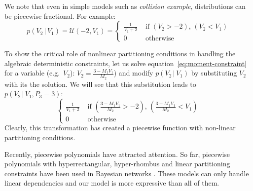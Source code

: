 \documentclass{article}
\newcommand{\case}[2]{#2 &\text{ if } #1}%
\newcommand{\otherwise}[1]{#1 &\text{ otherwise}}
\newcommand{\pr}{p}
\begin{document}
{{%
We note that even in simple models such as \emph{collision example}, distributions can be piecewise fractional. For example:  
\[
\pr(V_2 \,|\, V_1) = \mathcal{U}(-2, V_1)
=
\begin{cases}
  \case{\scriptstyle (V_2 > -2), \, (V_2 < V_1)}{\frac{1}{V_1 + 2}}\\
 \otherwise{0}
 \end{cases}
\]

To show the critical role of nonlinear partitioning conditions in handling the algebraic deterministic constraints, 
let us solve equation~\ref{eq:moment-constraint} for a variable (e.g.\ $V_2$):
$V_2 = \frac{3 - M_1 V_1}{M_2}$) and modify $\pr(V_2 \,|\, V_1)$ by substituting $V_2$ with its the solution.
We will see that this substitution leads to $\pr(V_2 \,|\, V_1, P_3 = 3)$:
\begin{equation}
\label{e:fractional-constraint}
\begin{cases}
  \case{(\frac{3 - M_1 V_1}{M_2} > -2) , \, (\frac{3 - M_1 V_1}{M_2} < V_1)}{\frac{1}{V_1 +2}}\\
  \otherwise{0}
  \end{cases}
\end{equation}
Clearly, this transformation has created a piecewise function with non-linear partitioning conditions.

Recently, piecewise polynomials have attracted attention.
So far, piecewise polynomials with hyperrectangular, hyper-rhombus and linear partitioning constraints have been used in Bayesian networks \cite{shenoy2011inference,shenoy2012two,Sanner:12}.
These models can only handle linear dependencies and 
our model is more expressive than all of them. 

}}
\end{document}
